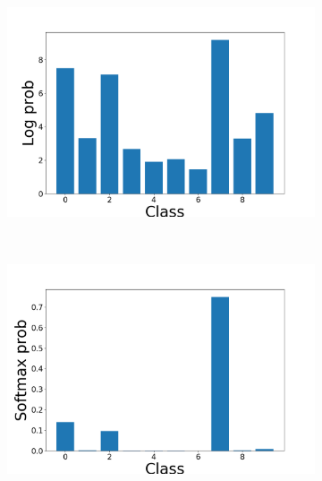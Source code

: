 \documentclass{kththesis}
\begin{document}
\begin{figure}[h]
    \centering
    \begin{subfigure}[b]{0.3\textwidth}
        \includegraphics[width=\textwidth]{softmax_in}
    \end{subfigure}
    ~ %
    \begin{subfigure}[b]{0.3\textwidth}
        \includegraphics[width=\textwidth]{softmax_t1}
      \end{subfigure}
    ~
    \begin{subfigure}[b]{0.3\textwidth}

\end{subfigure}
\end{figure}
\end{document}
